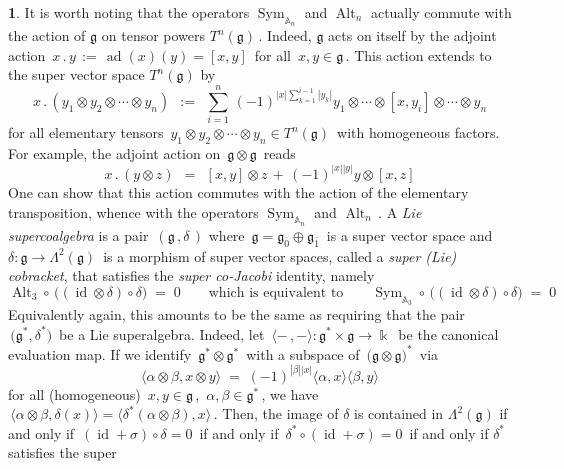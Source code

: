 \documentclass[12pt,reqno,twoside,a4paper]{amsart}
\numberwithin{equation}{section}
\theoremstyle{definition}
\newtheorem{free text}[lema]{}
\theoremstyle{remark}
\newcommand \id{\operatorname{id}}
\newcommand \ad{\operatorname{ad}}
\newcommand \Alt{\operatorname{Alt}}
\newcommand \Sym{\operatorname{Sym}}
\newcommand{\ot}{\otimes}
\newcommand{\zero}{{\bar{0}}}
\newcommand{\one}{{\bar{1}}}
\def \lieg{\mathfrak{g}}
\theoremstyle{plain}
\begin{document}
\begin{free text}
%
   \indent   It is worth noting that the operators  $\Sym_{\mathbb{A}_n} $  and  $ \Alt_n $  actually commute with the action of  $ \lieg $  on tensor powers  $ T^n(\lieg) \, $.  Indeed,  $ \lieg $  acts on itself by the adjoint action  $ \, x\,.\,y \, := \, \ad(x)(y) = [x,y] \, $  for all  $ \, x , y \in \lieg \, $.  This action extends to the super vector space  $ T^n(\lieg) $  by
%
\begin{equation}  \label{eq: action-g-tensor}
%
  x\,.\,(y_1 \ot y_2 \ot \cdots \ot y_n)  \,\; := \;\,
{\textstyle \sum\limits_{i=1}^n} \, {(-1)}^{|x| \sum_{k=1}^{i-1} |y_k|} y_1 \ot \cdots \ot [x,y_i] \ot \cdots \ot y_n
%
\end{equation}
%
 for all elementary tensors  $ \, y_1 \ot y_2 \ot \cdots \ot y_n \in T^n(\lieg) \, $  with homogeneous factors.  For example, the adjoint action on  $ \, \lieg \ot \lieg \, $  reads
%
  $$  x\,.\,(y\ot z)  \,\; = \;\,  [x,y] \ot z \, + \, {(-1)}^{|x| |y|} y \ot [x,z]  $$
%
 One can show that this action commutes with the action of the elementary transposition, whence with the operators  $\Sym_{\mathbb{A}_n} $ and  $ \Alt_n \, $.
%
 \vskip3pt
%
   A  \emph{Lie supercoalgebra\/}  is a pair  $ \, (\lieg\,,\delta\,) $  where  $ \, \lieg = \lieg_{\zero} \oplus \lieg_\one \, $  is a super vector space  and  $ \delta : \lieg \longrightarrow \Lambda^2(\lieg) \, $  is a morphism of super vector spaces, called a  \emph{super (Lie) cobracket},  that satisfies the  \emph{super co-Jacobi\/}  identity, namely
%
  $$  \Alt_3 \circ\, \big( (\id\ot\delta) \circ \delta \big)  \; = \;  0   \!\!\qquad  \text{which is equivalent to}  \qquad\!\!   \Sym_{\mathbb{A}_3} \circ\, \big( (\id \ot \delta) \circ \delta \big)  \; = \;  0  $$
%
 Equivalently again, this amounts to be the same as requiring that the pair  $ \, \big( \lieg^* , \delta^* \big) \, $  be a Lie superalgebra.  Indeed, let  $ \, \langle - \,, -\rangle : \lieg^* \times \lieg \longrightarrow \Bbbk \, $  be the canonical evaluation map.  If we identify  $ \, \lieg^* \otimes \lieg^* \, $  with a subspace of  $ \, {\big( \lieg \otimes \lieg \big)}^* \, $  via
%
  $$  \big\langle \alpha \ot \beta , x \ot y \big\rangle  \; = \;  {(-1)}^{|\beta| |x|} \langle \alpha , x \rangle \langle \beta , y \rangle  $$
%
 for all (homogeneous)  $ \, x , y \in \lieg \, $,  $ \, \alpha , \beta \in \lieg^* \, $,  we have  $ \, \big\langle \alpha \ot \beta ,\delta(x) \big\rangle = \big\langle \delta^*(\alpha \ot \beta) , x \big\rangle \, $.  Then, the image of  $ \delta $  is contained in  $ \Lambda^2(\lieg) $ if and only if  $ \, (\id+\sigma) \circ \delta = 0 \, $  if and only if  $ \, \delta^* \circ (\id + \sigma) = 0 \, $  if and only if  $ \delta^* $  satisfies the super

\end{free text}
\end{document}

